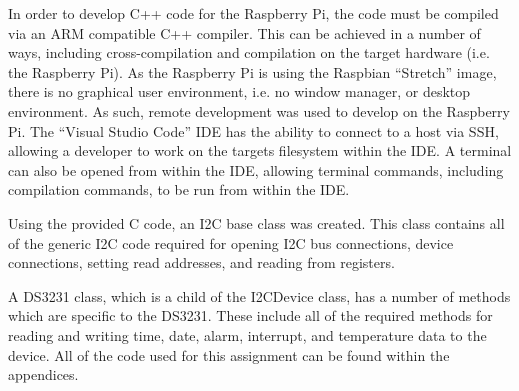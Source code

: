 In order to develop C++ code for the Raspberry Pi, the code must be compiled via
an ARM compatible C++ compiler. This can be achieved in a number of ways,
including cross-compilation and compilation on the target hardware (i.e. the
Raspberry Pi). As the Raspberry Pi is using the Raspbian ``Stretch'' image,
there is no graphical user environment, i.e. no window manager, or desktop
environment. As such, remote development was used to develop on the Raspberry
Pi. The ``Visual Studio Code'' IDE has the ability to connect to a host via SSH,
allowing a developer to work on the targets filesystem within the IDE. A
terminal can also be opened from within the IDE, allowing terminal commands,
including compilation commands, to be run from within the IDE.

Using the provided C code, an I2C base class was created. This class contains
all of the generic I2C code required for opening I2C bus connections, device
connections, setting read addresses, and reading from registers.

A DS3231 class, which is a child of the I2CDevice class, has a number of methods
which are specific to the DS3231. These include all of the required methods for
reading and writing time, date, alarm, interrupt, and temperature data to the
device. All of the code used for this assignment can be found within the
appendices.
